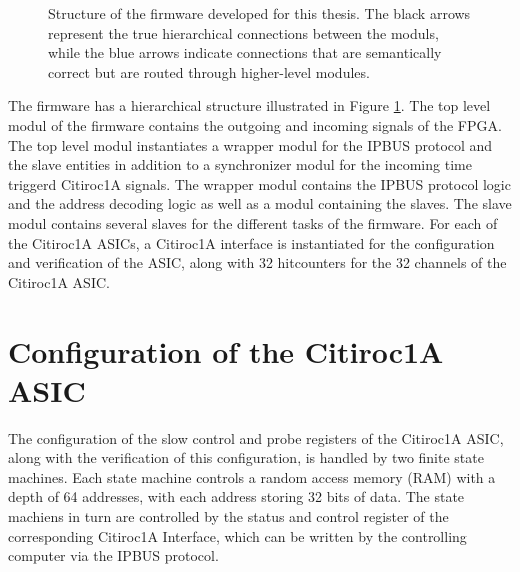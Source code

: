 \begin{figure}[H]
\begin{tikzpicture}[node distance=2cm]
        
    \end{tikzpicture}
    \caption{Structure of the firmware developed for this thesis. The black arrows represent the true hierarchical 
    connections between the moduls, while the blue arrows indicate connections that are semantically correct but are routed through higher-level modules.}
    \label{fig:Firmware_structure}
\end{figure}
The firmware has a hierarchical structure illustrated in Figure \ref{fig:Firmware_structure}. 
\newline
The top level modul of the firmware contains the outgoing and incoming signals of the FPGA.
\newline
The top level modul instantiates a wrapper modul for the IPBUS protocol and the slave entities in addition to a synchronizer modul for the incoming time triggerd Citiroc1A signals. 
\newline
The wrapper modul contains the IPBUS protocol logic and the address decoding logic as well as a modul containing the slaves.
\newline
The slave modul contains several slaves for the different tasks of the firmware. For each of the Citiroc1A ASICs, a Citiroc1A interface is instantiated for the configuration and verification of the ASIC, along with
32 hitcounters for the 32 channels of the Citiroc1A ASIC. 



\section{Configuration of the Citiroc1A ASIC}

The configuration of the slow control and probe registers of the Citiroc1A ASIC,
 along with the verification of this configuration, is handled by two finite state machines.
 \newline
  Each state machine controls a random access memory (RAM) with a depth of 64 addresses,
  with each address storing 32 bits of data.
 \newline
The state machiens in turn are controlled by the status and control register of the corresponding Citiroc1A Interface, which can be written by the controlling computer via the IPBUS protocol.
